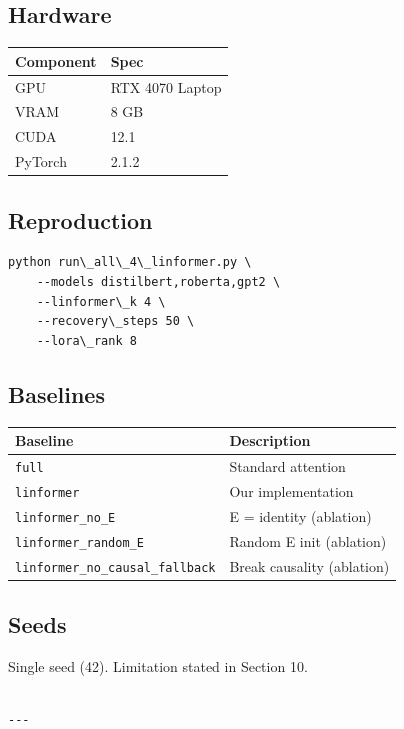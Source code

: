 \subsection{Hardware}

\begin{table}[H]
\centering
\small
\begin{tabular}{ll}
\toprule
\textbf{Component} & \textbf{Spec} \\
\midrule
GPU & RTX 4070 Laptop \\
VRAM & 8 GB \\
CUDA & 12.1 \\
PyTorch & 2.1.2 \\
\bottomrule
\end{tabular}
\end{table}

\subsection{Reproduction}

\begin{lstlisting}
python run\_all\_4\_linformer.py \
    --models distilbert,roberta,gpt2 \
    --linformer\_k 4 \
    --recovery\_steps 50 \
    --lora\_rank 8
\end{lstlisting}

\subsection{Baselines}

\begin{table}[H]
\centering
\small
\begin{tabular}{ll}
\toprule
\textbf{Baseline} & \textbf{Description} \\
\midrule
\texttt{full} & Standard attention \\
\texttt{linformer} & Our implementation \\
\texttt{linformer\_no\_E} & E = identity (ablation) \\
\texttt{linformer\_random\_E} & Random E init (ablation) \\
\texttt{linformer\_no\_causal\_fallback} & Break causality (ablation) \\
\bottomrule
\end{tabular}
\end{table}

\subsection{Seeds}

Single seed (42). Limitation stated in Section 10.
\begin{lstlisting}

---
\end{lstlisting}